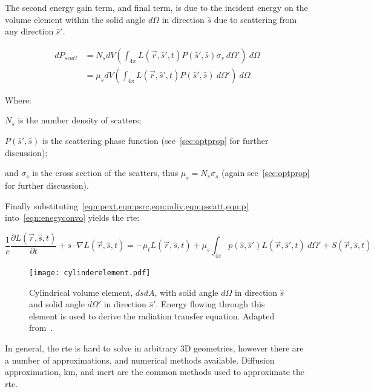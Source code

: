 The second energy gain term, and final term, is due to the incident energy on the volume element within the solid angle $d\Omega$ in direction $\hat{s}$ due to scattering from any direction $\hat{s}'$.

\begin{align}
	dP_{scatt}&=N_sdV\left(\int_{4\pi}L(\vec{r},\hat{s}',t)P(\hat{s}',\hat{s})\sigma_s\ d\Omega' \right)\ d\Omega \\
			  &=\mu_sdV\left(\int_{4\pi}L(\vec{r},\hat{s}',t)P(\hat{s}',\hat{s})\ d\Omega' \right)\ d\Omega 
			  \label{eqn:pscatt}
\end{align}

\noindent Where:

\indent $N_s$ is the number density of scatters;

\indent $P(\hat{s}',\hat{s})$ is the scattering phase function (see~\cref{sec:optprop} for further discussion);

\indent and $\sigma_s$ is the cross section of the scatters, thus $\mu_s=N_s\sigma_s$ (again see~\cref{sec:optprop} for further discussion).

\medskip


Finally substituting~\cref{eqn:pext,eqn:psrc,eqn:pdiv,eqn:pscatt,eqn:p} into~\cref{eqn:enegyconvo} yields the \gls{rte}:

\begin{equation}
\frac{1}{c}\frac{\partial L(\vec{r},\hat{s},t)}{\partial t} + s\cdot \nabla L(\vec{r},\hat{s},t)=-\mu_tL(\vec{r},\hat{s},t)+\mu_s\int_{4\pi}p(\hat{s},\hat{s}')L(\vec{r},\hat{s}',t)\ d\Omega' + S(\vec{r},\hat{s},t)
\label{eqn:rte}
\end{equation}

\begin{figure}[!htb]
	\centering
	\texttt{[image: cylinderelement.pdf]}
	\caption{Cylindrical volume element, $ds dA$, with solid angle $d\Omega$ in direction $\hat{s}$ and solid angle $d\Omega'$ in direction $\hat{s}'$. Energy flowing through this element is used to derive the radiation transfer equation. Adapted from~\cite{wang2012biomedical,chandrasekhar2013radiative}.}
	\label{fig:energydiag2}
\end{figure}

In general, the \gls{rte} is hard to solve in arbitrary 3D geometries, however there are a number of approximations, and numerical methods available. Diffusion approximation, \gls{km}, and \gls{mcrt} are the common methods used to approximate the \gls{rte}.

